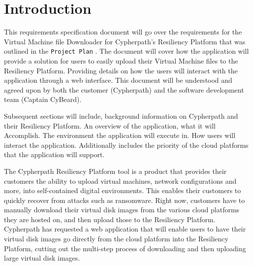 \documentclass{article}
\begin{document}
    


    \tableofcontents
    \newpage
    \listoffigures


    \newpage
    \begin{versionhistory}
    \end{versionhistory}
    \newpage


    \section{Introduction}
    This requirements specification document will go over the requirements for the Virtual Machine file Downloader for Cypherpath's Resiliency Platform that was outlined in the
    \texttt{Project Plan} \cite{projectplan}.
    The document will cover how the application will provide a solution for users to easily upload their Virtual Machine files to the Resiliency Platform.
    Providing details on how the users will interact with the application through a web interface. This document will be understood and agreed
    upon by both the customer (Cypherpath) and the software development team (Captain CyBeard).

    Subsequent sections will include, background information on Cypherpath and their Resiliency Platform. An overview of the application, what it
    will Accomplish. The environment the application will execute in. How users will interact the application. Additionally includes the priority of the cloud platforms that the application will support.

	The Cypherpath Resiliency Platform tool is a product that provides their customers the ability to upload virtual machines, network configurations and more, into 
    self-contained digital environments. This enables their customers to quickly recover from attacks such as ransomware. Right now, customers have to manually download their virtual disk images from
    the various cloud platforms they are hosted on, and then upload those to the Resiliency Platform. Cypherpath has requested a web application that will enable users to have their virtual disk images go
    directly from the cloud platform into the Resiliency Platform, cutting out the multi-step process of downloading and then uploading large virtual disk images.
	
\end{document}
